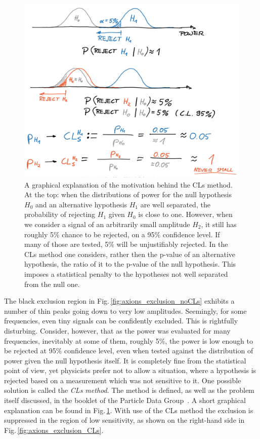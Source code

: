 
\begin{figure}
  \centering \includegraphics[width=0.7\linewidth]{gfx/axions/CLs.png}
  \caption{A graphical explanation of the motivation behind the CLs method. At the top: when the distributions of power for the null hypothesis $H_0$ and an alternative hypothesis $H_1$ are well separated, the probability of rejecting $H_1$ given $H_0$ is close to one. However, when we consider a signal of an arbitrarily small amplitude $H_2$, it still has roughly 5\% chance to be rejected, on a 95\% confidence level. If many of those are tested, 5\% will be unjustifiably rejected. In the CLs method one considers, rather then the p-value of an alternative hypothesis, the ratio of it to the p-value of the null hypothesis. This imposes a statistical penalty to the hypotheses not well separated from the null one.}
  \label{fig:CLs}
\end{figure}

The black exclusion region in Fig.\,\ref{fig:axions_exclusion_noCLs} exhibits a number of thin peaks going down to very low amplitudes. Seemingly, for some frequencies, even tiny signals can be confidently excluded. This is rightfully disturbing. Consider, however, that as the power was evaluated for many frequencies, inevitably at some of them, roughly 5\%, the power is low enough to be rejected at 95\% confidence level, even when tested against the distribution of power given the null hypothesis itself. It is completely fine from the statistical point of view, yet physicists prefer not to allow a situation, where a hypothesis is rejected based on a measurement which was not sensitive to it. One possible solution is called the \emph{CLs method}. The method is defined, as well as the problem itself discussed, in the booklet of the Particle Data Group~\citep{PDG2016}. A short graphical explanation can be found in Fig.\,\ref{fig:CLs}. With use of the CLs method the exclusion is suppressed in the region of low sensitivity, as shown on the right-hand side in Fig.\,\ref{fig:axions_exclusion_CLs}.

